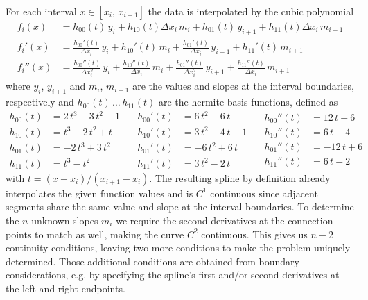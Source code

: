 For each interval $x \in [x_{i},\,x_{i+1}]$ the data is interpolated by the cubic polynomial
%
\begin{align}
f_{i}(x) &= h_{00}(t)\,y_{i} + h_{10}(t)\Delta x_{i}\,m_{i} + h_{01}(t)\,y_{i+1} + h_{11}(t)\Delta x_{i}\,m_{i+1} \\
f_{i}'(x) &= \frac{h_{00}'(t)}{\Delta x_{i}}\,y_{i} + h_{10}'(t)\,m_{i} + \frac{h_{01}'(t)}{\Delta x_{i}}\,y_{i+1} + h_{11}'(t)\,m_{i+1} \\
f_{i}''(x) &= \frac{h_{00}''(t)}{\Delta x_{i}^2}\,y_{i} + \frac{h_{10}''(t)}{\Delta x_{i}}\,m_{i} + \frac{h_{01}''(t)}{\Delta x_{i}^2}\,y_{i+1} + \frac{h_{11}''(t)}{\Delta x_{i}}\,m_{i+1}
\end{align}
%
where $y_{i}$, $y_{i+1}$ and $m_{i}$, $m_{i+1}$ are the values and slopes at the interval boundaries, respectively and $h_{00}(t)\,\ldots\,h_{11}(t)$ are the hermite basis functions, defined as
%
\begin{equation}
\begin{aligned}
h_{00}(t) &= 2\,t^3 - 3\,t^2 + 1 \\
h_{10}(t) &= t^3 - 2\,t^2 + t \\
h_{01}(t) &= -2\,t^3 + 3\,t^2 \\
h_{11}(t) &= t^3 - t^2
\end{aligned}
\quad
\begin{aligned}
h_{00}'(t) &= 6\,t^2 - 6\,t \\
h_{10}'(t) &= 3\,t^2 - 4\,t + 1 \\
h_{01}'(t) &= -6\,t^2 + 6\,t \\
h_{11}'(t) &= 3\,t^2 - 2\,t
\end{aligned}
\quad
\begin{aligned}
h_{00}''(t) &= 12\,t - 6 \\
h_{10}''(t) &= 6\,t - 4 \\
h_{01}''(t) &= -12\,t + 6 \\
h_{11}''(t) &= 6\,t - 2
\end{aligned}
\end{equation}
%
with $t = (x - x_{i})/(x_{i+1} - x_{i})$. The resulting spline by definition already interpolates the given function values and is $C^1$ continuous since adjacent segments share the same value and slope at the interval boundaries.
To determine the $n$ unknown slopes $m_{i}$ we require the second derivatives at the connection points to match as well, making the curve $C^2$ continuous. This gives us $n-2$ continuity conditions, leaving two more conditions to make the problem uniquely determined.
Those additional conditions are obtained from boundary considerations, e.g. by specifying the spline's first and/or second derivatives at the left and right endpoints.

